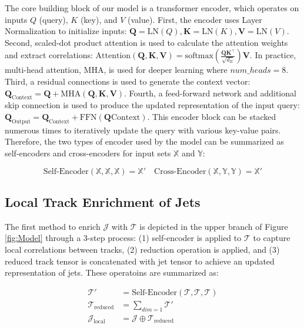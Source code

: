 The core building block of our model is a transformer encoder, which operates on inputs \(Q\) (query), \(K\) (key), and \(V\) (value). First, the encoder uses Layer Normalization to initialize inputs: $\mathbf{Q} = \text{LN}(Q), \mathbf{K} = \text{LN}(K), \mathbf{V} = \text{LN}(V)$. Second, scaled-dot product attention is used to calculate the attention weights and extract correlations: $\text{Attention}(\mathbf{Q}, \mathbf{K}, \mathbf{V}) = \text{softmax}\left(\frac{\mathbf{Q} \mathbf{K}^\top}{\sqrt{d_E}}\right) \mathbf{V}$. In practice, multi-head attention, MHA, is used for deeper learning where $num\_heads=8$. Third, a residual connections is used to generate the context vector: $\mathbf{Q}_\text{Context} = \mathbf{Q} + \text{MHA}(\mathbf{Q}, \mathbf{K}, \mathbf{V})$. Fourth, a feed-forward network and additional skip connection is used to produce the updated representation of the input query: $\mathbf{Q}_\text{Output} = \mathbf{Q}_\text{Context} + \text{FFN}(\mathbf{Q}\text{Context})$. This encoder block can be stacked numerous times to iteratively update the query with various key-value pairs. Therefore, the two types of encoder used by the model can be summarized as self-encoders and cross-encoders for input sets $\mathbb{X}$ and $\mathbb{Y}$:

\begin{equation}
    \text{Self-Encoder}(\mathbb{X},\mathbb{X},\mathbb{X}) = \mathbb{X}' \quad \text{Cross-Encoder}(\mathbb{X},\mathbb{Y},\mathbb{Y}) = \mathbb{X}'
\end{equation}

\subsection{Local Track Enrichment of Jets}
\label{sec:trk-agg}

The first method to enrich $\mathcal{J}$ with $\mathcal{T}$ is depicted in the upper branch of Figure \ref{fig:Model} through a 3-step process: (1) self-encoder is applied to $\mathcal{T}$ to capture local correlations between tracks, (2) reduction operation is applied, and (3) reduced track tensor is concatenated with jet tensor to achieve an updated representation of jets. These operatoins are summarized as:

\begin{align}
  \mathcal{T}' &= \text{Self-Encoder}(\mathcal{T},\mathcal{T},\mathcal{T}) \\
  \mathcal{T}_\text{reduced}&=\sum\limits_{dim=1} \mathcal{T}' \\
  \mathcal{J}_\text{local}&=\mathcal{J} \oplus \mathcal{T}_\text{reduced}
\end{align}


